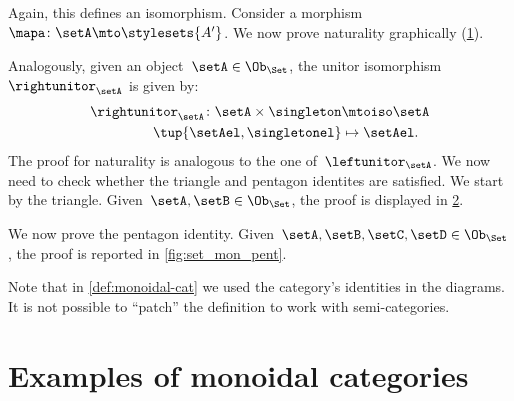 \begin{example}
    Again, this defines an isomorphism.
    Consider a morphism~$\mapa\colon \setA\mto \stylesets{A'}$.
    We now prove naturality graphically (\cref{fig:monoidal_set_unit_nat}).
    
    \begin{figure}[h!]
        \centering
        \caption{}
        \label{fig:monoidal_set_unit_nat}
    \end{figure}
    
    Analogously, given an object~$\setA\in \Ob_{\Set}$, the unitor isomorphism~$\rightunitor_\setA$ is given by:
    \begin{equation*}
        \label{eq:set_mon_prod_5}
        \begin{aligned}
            \rightunitor_\setA\colon \setA\times \singleton &\mtoiso \setA\\
            \tup{\setAel,\singletonel}&\mapsto \setAel.
        \end{aligned}
    \end{equation*}
    The proof for naturality is analogous to the one of~$\leftunitor_\setA$.
    We now need to check whether the triangle and pentagon identites are satisfied.
    We start by the triangle.
Given~$\setA,\setB\in \Ob_{\Set}$, the proof is displayed in \cref{fig:set_mon_triangle}.
    
    \begin{figure}[h]
        \centering
        \caption{}
        \label{fig:set_mon_triangle}
    \end{figure}
    
    We now prove the pentagon identity.
    Given~$\setA,\setB,\setC,\setD\in \Ob_\Set$, the proof is reported in \cref{fig:set_mon_pent}.
    
    \begin{figure*}[h]
        \centering
        \caption{}
        \label{fig:set_mon_pent}
    \end{figure*}
\end{example}

\begin{remark}
    Note that in \cref{def:monoidal-cat} we used the category's identities in the diagrams.
It is not possible to ``patch'' the definition to work with semi-categories.
\end{remark}


\section{Examples of monoidal categories}

